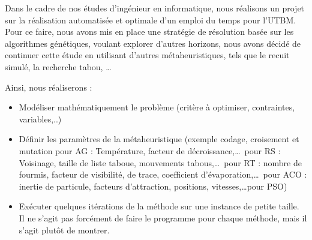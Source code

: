 

Dans le cadre de nos études d'ingénieur en informatique, nous réalisons un projet sur la réalisation automatisée et optimale d'un emploi du temps pour l'\gls{UTBM}.
Pour ce faire, nous avons mis en place une stratégie de résolution basée sur les algorithmes génétiques\cite{burke1994genetic}, voulant explorer d'autres horizons, nous avons décidé de continuer cette étude en utilisant d'autres métaheuristiques, tels que le recuit simulé, la recherche tabou, \ldots\

Ainsi, nous réaliserons :
\begin{itemize}
    \item Modéliser mathématiquement le problème (critère à optimiser, contraintes, variables,..)
    \item Définir les paramètres de la métaheuristique (exemple codage, croisement et mutation pour AG : Température, facteur de décroissance,\ldots\ pour RS : Voisinage, taille de liste taboue, mouvements tabous,\ldots\ pour RT : nombre de fourmis, facteur de visibilité, de trace, coefficient d'évaporation,\ldots\ pour ACO : inertie de particule, facteurs d'attraction, positions, vitesses,\ldots pour PSO)
    \item Exécuter quelques itérations de la méthode sur une instance de petite taille.
    Il ne s’agit pas forcément de faire le programme pour chaque méthode, mais il s’agit plutôt de montrer.
\end{itemize}

